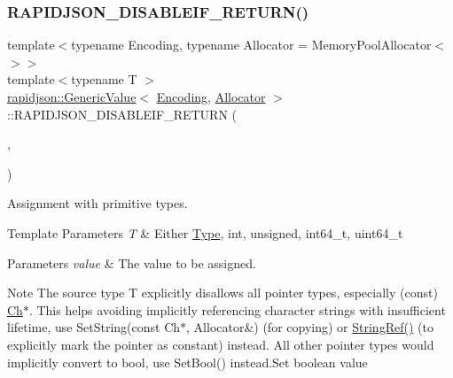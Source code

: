\subsubsection{\texorpdfstring{RAPIDJSON\_DISABLEIF\_RETURN()}{RAPIDJSON\_DISABLEIF\_RETURN()}}
{\footnotesize\ttfamily template$<$typename Encoding, typename Allocator = Memory\+Pool\+Allocator$<$$>$$>$ \\
template$<$typename T $>$ \\
\mbox{\hyperlink{classrapidjson_1_1_generic_value}{rapidjson\+::\+Generic\+Value}}$<$ \mbox{\hyperlink{classrapidjson_1_1_encoding}{Encoding}}, \mbox{\hyperlink{classrapidjson_1_1_allocator}{Allocator}} $>$\+::R\+A\+P\+I\+D\+J\+S\+O\+N\+\_\+\+D\+I\+S\+A\+B\+L\+E\+I\+F\+\_\+\+R\+E\+T\+U\+RN (\begin{DoxyParamCaption}\item[{(internal\+::\+Is\+Pointer$<$ T $>$)}]{,  }\item[{(\mbox{\hyperlink{classrapidjson_1_1_generic_value}{Generic\+Value}}$<$ \mbox{\hyperlink{classrapidjson_1_1_encoding}{Encoding}}, \mbox{\hyperlink{classrapidjson_1_1_allocator}{Allocator}} $>$ \&)}]{ }\end{DoxyParamCaption})}



Assignment with primitive types. 


\begin{DoxyTemplParams}{Template Parameters}
{\em T} & Either \mbox{\hyperlink{namespacerapidjson_ae79a4751c1c460ff0de5ecc07874f3e4}{Type}}, {\ttfamily int}, {\ttfamily unsigned}, {\ttfamily int64\+\_\+t}, {\ttfamily uint64\+\_\+t} \\
\hline
\end{DoxyTemplParams}

\begin{DoxyParams}{Parameters}
{\em value} & The value to be assigned.\\
\hline
\end{DoxyParams}
\begin{DoxyNote}{Note}
The source type {\ttfamily T} explicitly disallows all pointer types, especially ({\ttfamily const}) \mbox{\hyperlink{classrapidjson_1_1_generic_value_adcdbc7fa85a9a41b78966d7e0dcc2ac4}{Ch}}$\ast$. This helps avoiding implicitly referencing character strings with insufficient lifetime, use Set\+String(const Ch$\ast$, Allocator\&) (for copying) or \mbox{\hyperlink{namespacerapidjson_aa6b9fd9f6aa49405a574c362ba9af6b5}{String\+Ref()}} (to explicitly mark the pointer as constant) instead. All other pointer types would implicitly convert to {\ttfamily bool}, use Set\+Bool() instead.\+Set boolean value 
\end{DoxyNote}
\mbox{\label{classrapidjson_1_1_generic_value_a00efe429e27f95dca17b19519b3cea9e}} 

